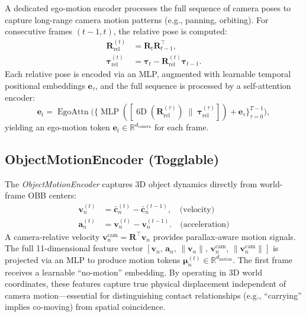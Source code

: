 \documentclass{article}
\newcommand{\mR}{\mathbb{R}}
\newcommand{\op}[1]{\operatorname{#1}}
\newcommand{\mat}[1]{\bm{#1}}
\begin{document}
A dedicated ego-motion encoder processes the full sequence of camera poses to capture long-range camera motion patterns (e.g., panning, orbiting).  For consecutive frames $(t{-}1, t)$, the relative pose is computed:
\begin{align}
    \mat{R}_{\text{rel}}^{(t)} &= \mat{R}_t \mat{R}_{t-1}^{\!\top}, \label{eq:rel_rot} \\
    \boldsymbol{\tau}_{\text{rel}}^{(t)} &= \boldsymbol{\tau}_t - \mat{R}_{\text{rel}}^{(t)}\boldsymbol{\tau}_{t-1}. \label{eq:rel_trans}
\end{align}
Each relative pose is encoded via an MLP, augmented with learnable temporal positional embeddings $\mat{e}_{\tau}$, and the full sequence is processed by a self-attention encoder:
\begin{equation}
    \mat{e}_t = \op{EgoAttn}\bigl(\{\op{MLP}([\op{6D}(\mat{R}_{\text{rel}}^{(\tau)}) \;\|\; \boldsymbol{\tau}_{\text{rel}}^{(\tau)}]) + \mat{e}_{\tau}\}_{\tau=0}^{T-1}\bigr),
    \label{eq:ego_motion}
\end{equation}
yielding an ego-motion token $\mat{e}_t \in \mR^{d_{\text{camera}}}$ for each frame.

\subsection{ObjectMotionEncoder (Togglable)}

The \emph{ObjectMotionEncoder} captures 3D object dynamics directly from world-frame OBB centers:
\begin{align}
    \mat{v}_n^{(t)} &= \bar{\mat{c}}_n^{(t)} - \bar{\mat{c}}_n^{(t-1)}, \quad \text{(velocity)} \label{eq:velocity} \\
    \mat{a}_n^{(t)} &= \mat{v}_n^{(t)} - \mat{v}_n^{(t-1)}. \quad \text{(acceleration)} \label{eq:accel}
\end{align}
A camera-relative velocity $\mat{v}_n^{\text{cam}} = \mat{R}^{\!\top}\mat{v}_n$ provides parallax-aware motion signals.  The full 11-dimensional feature vector $[\mat{v}_n,\,\mat{a}_n,\,\|\mat{v}_n\|,\,\mat{v}_n^{\text{cam}},\,\|\mat{v}_n^{\text{cam}}\|]$ is projected via an MLP to produce motion tokens $\mat{\mu}_n^{(t)} \in \mR^{d_{\text{motion}}}$.  The first frame receives a learnable ``no-motion'' embedding.  By operating in 3D world coordinates, these features capture true physical displacement independent of camera motion---essential for distinguishing contact relationships (e.g., ``carrying'' implies co-moving) from spatial coincidence.
\end{document}
